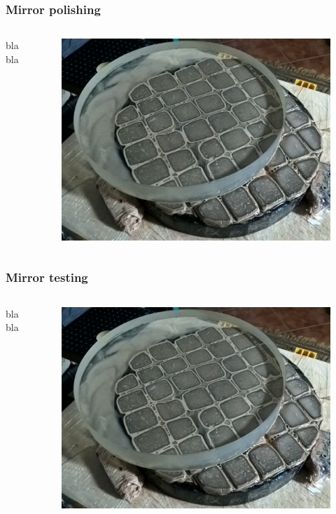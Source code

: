 \documentclass{beamer}
\begin{document}
\begin{frame}
\frametitle{Mirror polishing}
\begin{columns}
bla bla
\begin{figure}
\includegraphics[scale=0.2]{assets/polishing.jpg}
\end{figure}
\end{columns}
\end{frame}

\begin{frame}
\frametitle{Mirror testing}
\begin{columns}
bla bla
\begin{figure}
\includegraphics[scale=0.2]{assets/polishing.jpg}
\end{figure}
\end{columns}
\end{frame}
\end{document}
